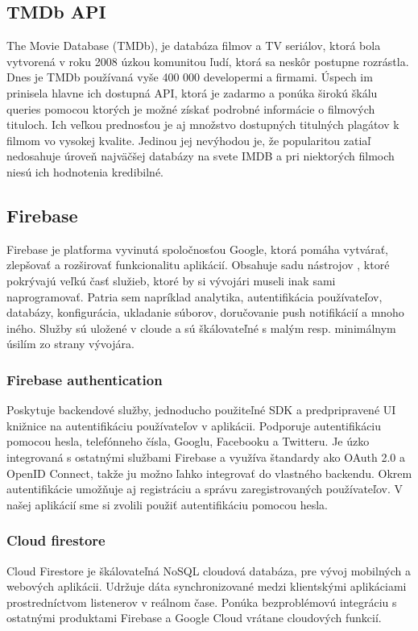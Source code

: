 \subsection{TMDb API}
The Movie Database (TMDb), je databáza filmov a TV seriálov, ktorá bola vytvorená v roku 2008 úzkou komunitou ľudí, ktorá sa neskôr postupne rozrástla. Dnes je TMDb používaná vyše 400 000 developermi a firmami. Úspech im prinisela hlavne ich dostupná API, ktorá je zadarmo a ponúka širokú škálu queries pomocou ktorých je možné získať podrobné informácie o filmových tituloch. Ich veľkou prednosťou je aj množstvo dostupných titulných plagátov k filmom vo vysokej kvalite. Jedinou jej nevýhodou je, že popularitou zatiaľ nedosahuje úroveň najväčšej databázy na svete IMDB a pri niektorých filmoch niesú ich hodnotenia kredibilné. \\

\subsection{Firebase}
Firebase je platforma vyvinutá spoločnosťou Google, ktorá pomáha vytvárať, zlepšovať a rozširovať funkcionalitu aplikácií. Obsahuje sadu nástrojov , ktoré pokrývajú veľkú časť služieb, ktoré by si vývojári museli inak sami naprogramovať. Patria sem napríklad analytika, autentifikácia používateľov, databázy, konfigurácia, ukladanie súborov, doručovanie push notifikácií a mnoho iného. Služby sú uložené v cloude a sú škálovateľné s malým resp. minimálnym úsilím zo strany vývojára. \\

\subsubsection{Firebase authentication}
\label{sec:firebaseauth}
Poskytuje backendové služby, jednoducho použiteľné SDK a predpripravené UI knižnice na autentifikáciu používateľov v aplikácii. Podporuje autentifikáciu pomocou hesla, telefónneho čísla, Googlu, Facebooku a Twitteru. Je úzko integrovaná s ostatnými službami Firebase a využíva  štandardy ako OAuth 2.0 a OpenID Connect, takže ju možno ľahko integrovať do vlastného backendu. Okrem autentifikácie umožňuje aj registráciu a správu zaregistrovaných používateľov. V našej aplikácií sme si zvolili použiť autentifikáciu pomocou hesla. \\

\subsubsection{Cloud firestore}
\label{sec:firestore}
Cloud Firestore je škálovateľná NoSQL cloudová databáza, pre vývoj mobilných a webových aplikácii. Udržuje dáta synchronizované medzi klientskými aplikáciami prostredníctvom listenerov v reálnom čase. Ponúka bezproblémovú integráciu s ostatnými produktami Firebase a Google Cloud vrátane cloudových funkcií. 

